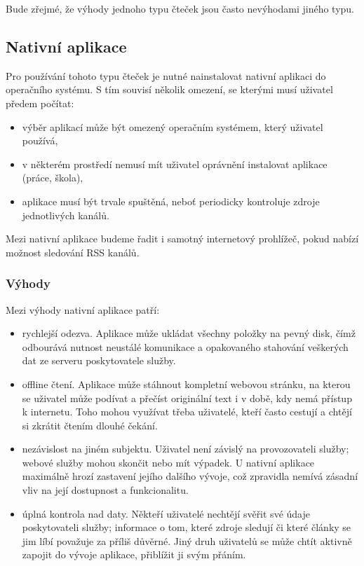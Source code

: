 Bude zřejmé, že výhody jednoho typu čteček jsou často nevýhodami jiného typu.

\subsection{Nativní aplikace}

Pro používání tohoto typu čteček je nutné nainstalovat nativní aplikaci do operačního systému.
S tím souvisí několik omezení, se kterými musí uživatel předem počítat:
\begin{itemize}
	\item výběr aplikací může být omezený operačním systémem, který uživatel používá,
	\item v některém prostředí nemusí mít uživatel oprávnění instalovat aplikace (práce, škola),
	\item aplikace musí být trvale spuštěná, neboť periodicky kontroluje zdroje jednotlivých kanálů.
\end{itemize}

Mezi nativní aplikace budeme řadit i samotný internetový prohlížeč, pokud nabízí možnost sledování RSS kanálů.

\subsubsection{Výhody}

Mezi výhody nativní aplikace patří:
\begin{itemize}
    \item rychlejší odezva.
        Aplikace může ukládat všechny položky na pevný disk, čímž odbourává nutnost neustálé komunikace a opakovaného stahování veškerých dat ze serveru poskytovatele služby.
    \item offline čtení.
        Aplikace může stáhnout kompletní webovou stránku, na kterou se uživatel může podívat a přečíst originální text i v době, kdy nemá přístup k internetu.
		Toho mohou využívat třeba uživatelé, kteří často cestují a chtějí si zkrátit čtením dlouhé čekání.
    \item nezávislost na jiném subjektu.
        Uživatel není závislý na provozovateli služby; webové služby mohou skončit nebo mít výpadek.
        U nativní aplikace maximálně hrozí zastavení jejího dalšího vývoje, což zpravidla nemívá zásadní vliv na její dostupnost a funkcionalitu.
	\item úplná kontrola nad daty.
		Někteří uživatelé nechtějí svěřit své údaje poskytovateli služby; informace o tom, které zdroje sledují či které články se jim líbí považuje za příliš důvěrné.
		Jiný druh uživatelů se může chtít aktivně zapojit do vývoje aplikace, přiblížit ji svým přáním.
\end{itemize}

